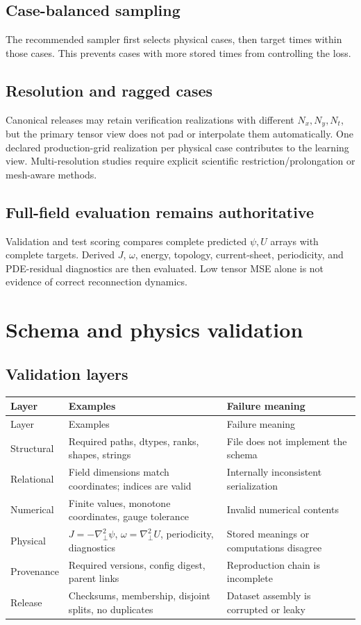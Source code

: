 \documentclass[11pt]{article}
\newcommand{\Lap}{\nabla_{\!\perp}^{2}}
\begin{document}
\subsection{Case-balanced sampling}
The recommended sampler first selects physical cases, then target times within those cases. This prevents cases with more stored times from controlling the loss.

\subsection{Resolution and ragged cases}
Canonical releases may retain verification realizations with different $N_x,N_y,N_t$, but the primary tensor view does not pad or interpolate them automatically. One declared production-grid realization per physical case contributes to the learning view. Multi-resolution studies require explicit scientific restriction/prolongation or mesh-aware methods.

\subsection{Full-field evaluation remains authoritative}
Validation and test scoring compares complete predicted $\psi,U$ arrays with complete targets. Derived $J$, $\omega$, energy, topology, current-sheet, periodicity, and PDE-residual diagnostics are then evaluated. Low tensor MSE alone is not evidence of correct reconnection dynamics.

\section{Schema and physics validation}
\label{sec:validation}

\subsection{Validation layers}

\begin{longtable}{p{}p{}p{}}
\toprule
Layer & Examples & Failure meaning \\
\midrule
\endfirsthead
\toprule
Layer & Examples & Failure meaning \\
\midrule
\endhead
Structural & Required paths, dtypes, ranks, shapes, strings & File does not implement the schema \\
Relational & Field dimensions match coordinates; indices are valid & Internally inconsistent serialization \\
Numerical & Finite values, monotone coordinates, gauge tolerance & Invalid numerical contents \\
Physical & $J=-\Lap\psi$, $\omega=\Lap U$, periodicity, diagnostics & Stored meanings or computations disagree \\
Provenance & Required versions, config digest, parent links & Reproduction chain is incomplete \\
Release & Checksums, membership, disjoint splits, no duplicates & Dataset assembly is corrupted or leaky \\
\bottomrule
\end{longtable}
\end{document}
